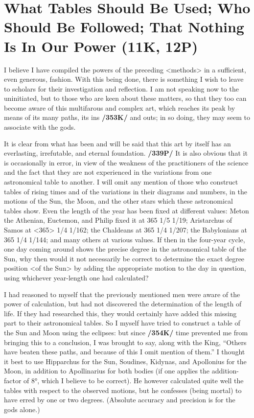 \section{What Tables Should Be Used; Who Should Be Followed; That Nothing Is In Our Power (11K, 12P)}

I believe I have compiled the powers of the preceding <methods> in a sufficient, even generous, fashion. With this being done, there is something I wish to leave to scholars for their investigation and reflection. I am not speaking now to the uninitiated, but to those who are keen about these matters, so that they too can become aware of this multifarous and complex art, which reaches its peak by means of its many paths, its ins \textbf{/353K/} and outs; in so doing, they may seem to associate with the gods. 

It is clear from what has been and will be said that this art by itself has an everlasting, irrefutable, and eternal foundation. \textbf{/339P/} It is also obvious that it is occasionally in error, in view of the weakness of the practitioners of the science and the fact that they are not experienced in the variations from one astronomical table to another. I will omit any mention of those who construct tables of rising times and of the variations in their diagrams and numbers, in the motions of the Sun, the Moon, and the other stars which these astronomical tables show. Even the length of the year has been fixed at different values: Meton the Athenian, Euctemon, and Philip fixed it at 365 1/5 1/19; Aristarchus of Samos at <365> 1/4 1/162; the Chaldeans at 365 1/4 1/207; the Babylonians at 365 1/4 1/144; and many others at various values. If then in the four-year cycle, one day coming around shows the precise degree in the astronomical table of the Sun, why then would it not necessarily be correct to determine the exact degree position <of the Sun> by adding the appropriate motion to the day in question, using whichever year-length one had calculated?

I had reasoned to myself that the previously mentioned men were aware of the power of calculation, but had not discovered the determination of the length of life. If they had researched this, they would certainly have added this missing part to their astronomical tables. So I myself have tried to construct a table of the Sun and Moon using the eclipses: but since \textbf{/354K/} time prevented me from bringing this to a conclusion, I was brought to say, along with the King, “Others have beaten these paths, and because of this I omit mention of them.” I thought it best to use Hipparchus for the Sun, Soudines, Kidynas, and Apollonius for the Moon, in addition to Apollinarius for both bodies (if one applies the addition-factor of 8°, which I believe to be correct). He however calculated quite well the tables with respect to the observed motions, but he confesses (being mortal) to have erred by one or two degrees. (Absolute accuracy and precision is for
the gods alone.) 

